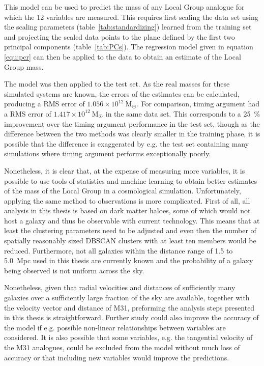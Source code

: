 \documentclass[english, twoside]{HYgradu}
\begin{document}
This model can be used to predict the mass of any Local Group analogue for which the 12 variables are measured. This requires first scaling the data set using the scaling parameters (table~\ref{tab:standardizing}) learned from the training set and projecting the scaled data points to the plane defined by the first two principal components (table~\ref{tab:PCs}). The regression model given in equation \ref{equ:pcr} can then be applied to the data to obtain an estimate of the Local Group mass.

The model was then applied to the test set. As the real masses for these simulated systems are known, the errors of the estimates can be calculated, producing a RMS error of $1.056 \times 10^{12}\ \mathrm{M}_{\astrosun}$. For comparison, timing argument had a RMS error of $1.417 \times 10^{12}\ \mathrm{M}_{\astrosun}$ in the same data set. %
This corresponds to a 25~\% improvement over the timing argument performance in the test set, though as the difference between the two methods was clearly smaller in the training phase, it is possible that the difference is exaggerated by e.g. the test set containing many simulations where timing argument performs exceptionally poorly.

Nonetheless, it is clear that, at the expense of measuring more variables, it is possible to use tools of statistics and machine learning to obtain better estimates of the mass of the Local Group in a cosmological simulation. Unfortunately, applying the same method to observations is more complicated. First of all, all analysis in this thesis is based on dark matter haloes, some of which would not host a galaxy and thus be observable with current technology. This means that at least the clustering parameters need to be adjusted and even then the number of spatially reasonably sized DBSCAN clusters with at least ten members would be reduced. Furthermore, not all galaxies within the distance range of 1.5 to 5.0~Mpc used in this thesis are currently known and the probability of a galaxy being observed is not uniform across the sky. %

Nonetheless, given that radial velocities and distances of sufficiently many galaxies over a sufficiently large fraction of the sky are available, together with the velocity vector and distance of M31, preforming the analysis steps presented in this thesis is straightforward. Further study could also improve the accuracy of the model if e.g. possible non-linear relationships between variables are considered. It is also possible that some variables, e.g. the tangential velocity of the M31 analogues, could be excluded from the model without much loss of accuracy or that including new variables would improve the predictions.
\end{document}
